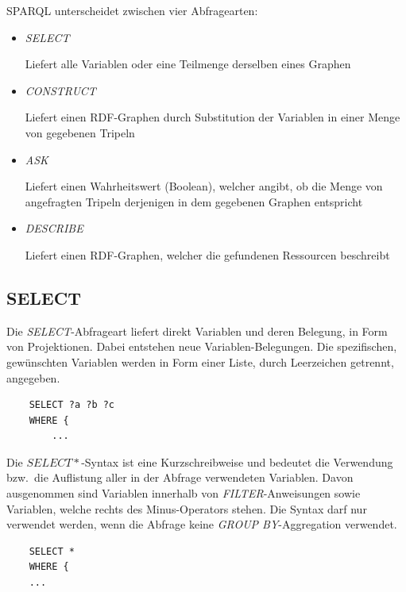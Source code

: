 SPARQL unterscheidet zwischen vier Abfragearten:
\begin{itemize}
    \item \textit{SELECT}

        Liefert alle Variablen oder eine Teilmenge derselben eines Graphen

    \item \textit{CONSTRUCT}

        Liefert einen RDF-Graphen durch Substitution der Variablen in einer Menge von gegebenen Tripeln

    \item \textit{ASK}

        Liefert einen Wahrheitswert (Boolean), welcher angibt, ob die Menge von angefragten Tripeln derjenigen in dem gegebenen Graphen entspricht

    \item \textit{DESCRIBE}

        Liefert einen RDF-Graphen, welcher die gefundenen Ressourcen beschreibt
\end{itemize}

\subsection{SELECT}
\label{subsec:sparql_abfragearten_select}
Die \textit{SELECT}-Abfrageart liefert direkt Variablen und deren Belegung, in Form von Projektionen. Dabei entstehen neue Variablen-Belegungen. Die spezifischen, gewünschten Variablen werden in Form einer Liste, durch Leerzeichen getrennt, angegeben.

\begin{lstlisting}
    SELECT ?a ?b ?c
    WHERE {
        ...
\end{lstlisting}

Die $ SELECT * $-Syntax ist eine Kurzschreibweise und bedeutet die Verwendung bzw.\ die Auflistung aller in der Abfrage verwendeten Variablen. Davon ausgenommen sind Variablen innerhalb von \textit{FILTER}-Anweisungen sowie Variablen, welche rechts des Minus-Operators stehen. Die Syntax darf nur verwendet werden, wenn die Abfrage keine \textit{GROUP BY}-Aggregation verwendet.
\begin{lstlisting}
    SELECT *
    WHERE {
    ...
\end{lstlisting}


